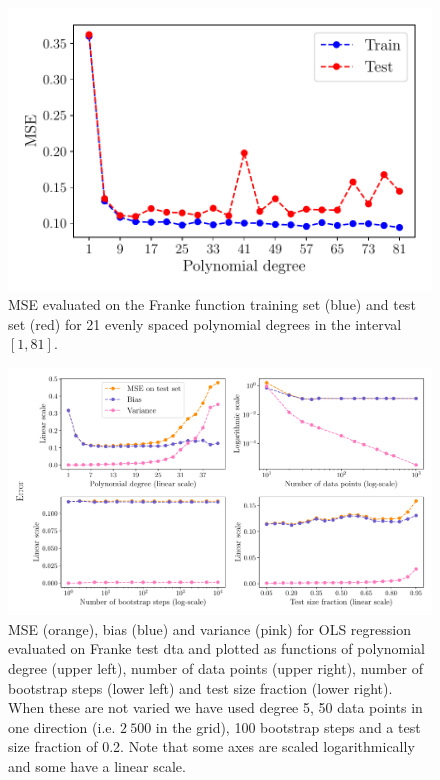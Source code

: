 \documentclass[aps,pra,english,notitlepage,reprint,nofootinbib]{revtex4-1}  %
\begin{document}
\begin{figure}[h!]
  \vspace*{-5pt}
  \centering %
  \includegraphics[width=\columnwidth]{../figs/e_MSE_train_test.pdf}
  \caption{MSE evaluated on the Franke function training set (blue) and test set (red) for 21 evenly spaced polynomial degrees in the interval $[1, 81]$.}\label{fig:e train test}
  \vspace*{-5pt}
\end{figure}

\begin{figure}
  \vspace*{-5pt}
  \centering %
  \includegraphics[width=\textwidth]{../figs/e_bias_variance.pdf}
  \caption{MSE (orange), bias (blue) and variance (pink) for OLS regression evaluated on Franke test dta and plotted as functions of polynomial degree (upper left), number of data points (upper right), number of bootstrap steps (lower left) and test size fraction (lower right). When these are not varied we have used degree 5, 50 data points in one direction (i.e. $2\:500$ in the grid), 100 bootstrap steps and a test size fraction of 0.2. Note that some axes are scaled logarithmically and some have a linear scale.}\label{fig:e bias variance}
  \vspace*{-5pt}
\end{figure}
\end{document}
